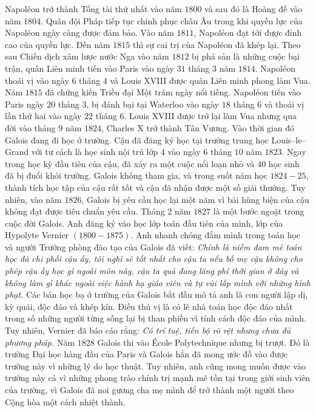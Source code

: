 \begin{multicols}{2}
	Napoléon trở thành Tổng tài thứ nhất vào năm $1800$ và sau đó là Hoàng đế vào năm $1804$. Quân đội Pháp tiếp tục chinh phục châu Âu trong khi quyền lực của Napoléon ngày càng được đảm bảo. Vào năm $1811$, Napoléon đạt tới được đỉnh cao của quyền lực. Đến năm $1815$ thì sự cai trị của Napoléon đã khép lại. Theo sau Chiến dịch xâm lược nước Nga vào  năm $1812$ bị phá sản là những cuộc bại trận, quân Liên minh tiến vào Paris vào ngày $31$ tháng $3$ năm $1814$. Napoléon thoái vị vào ngày $6$ tháng $4$ và Louis XVIII được quân Liên minh phong làm Vua. Năm $1815$ đã chứng kiến Triều đại Một trăm ngày nổi tiếng. Napoléon tiến vào Paris ngày $20$ tháng $3$, bị đánh bại tại Waterloo vào ngày $18$ tháng $6$ và thoái vị lần thứ hai vào ngày $22$ tháng $6$. Louis XVIII được trở lại làm Vua nhưng qua đời vào tháng $9$ năm $1824$, Charles X trở thành Tân Vương.
	\vskip 0.1cm
	Vào thời gian đó Galois đang đi học ở trường. Cậu đã đăng ký học tại trường trung học  Louis--le--Grand với tư cách là học sinh nội trú lớp $4$ vào ngày $6$ tháng $10$ năm $1823$. Ngay trong học kỳ đầu tiên của cậu, đã xảy ra một cuộc nổi loạn nhỏ và $40$ học sinh đã bị đuổi khỏi trường. Galois không tham gia, và trong suốt năm học $1824-25$, thành tích học tập của cậu rất tốt và cậu đã nhận được một số giải thưởng. Tuy nhiên, vào năm $1826$, Galois bị yêu cầu học lại một năm vì bài hùng biện của cậu không đạt được tiêu chuẩn yêu cầu.
	\vskip 0.1cm
	Tháng 2 năm $1827$ là một bước ngoặt trong cuộc đời Galois. Anh đăng ký vào học lớp toán đầu tiên của mình, lớp của Hypolyte Vernier $(1800-1875)$. Anh  nhanh chóng đắm mình trong toán học và người Trưởng phòng đào tạo của Galois đã viết:
	\vskip 0.1cm
	\textit{Chính là niềm đam mê toán học đã chi phối cậu ấy, tôi nghĩ sẽ tốt nhất cho cậu ta nếu bố mẹ cậu không cho phép cậu ấy học gì ngoài môn này, cậu ta quả đang lãng phí thời gian ở đây và không làm gì khác ngoài việc hành hạ giáo viên và tự vùi lấp mình với những hình phạt.}
	\vskip 0.1cm
	Các bản học bạ ở trường của Galois bắt đầu mô tả anh là con người lập dị, kỳ quái, độc đáo và khép kín. Điều thú vị là có lẽ nhà toán học độc đáo nhất trong số những người từng sống lại bị than phiền vì tính cách độc đáo của mình. Tuy nhiên, Vernier đã báo cáo rằng:
	\vskip 0.1cm
	\textit{Có trí tuệ, tiến bộ rõ rệt nhưng chưa đủ phương pháp.}
	\vskip 0.1cm
	Năm $1828$ Galois thi vào École Polytechnique nhưng bị trượt. Đó là trường Đại học hàng đầu của Paris và Galois hẳn đã mong ước đỗ vào được trường này vì những lý do học thuật. Tuy nhiên, anh cũng mong muốn được vào trường này cả vì những phong trào chính trị mạnh mẽ tồn tại trong giới sinh viên của trường, vì Galois đã noi gương cha mẹ mình để trở thành một người theo Cộng hòa một cách nhiệt thành.

\end{multicols}
